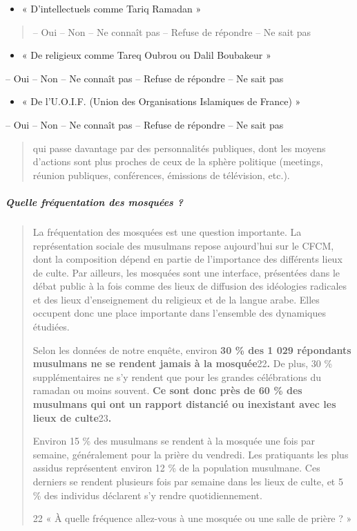 \begin{itemize}
\item
  « D'intellectuels comme Tariq Ramadan »
\end{itemize}

\begin{quote}
-- Oui -- Non -- Ne connaît pas -- Refuse de répondre -- Ne sait pas
\end{quote}

\begin{itemize}
\item
  « De religieux comme Tareq Oubrou ou Dalil Boubakeur »
\end{itemize}

-- Oui -- Non -- Ne connaît pas -- Refuse de répondre -- Ne sait pas

\begin{itemize}
\item
  « De l'U.O.I.F. (Union des Organisations Islamiques de France) »
\end{itemize}

-- Oui -- Non -- Ne connaît pas -- Refuse de répondre -- Ne sait pas

\begin{quote}


qui passe davantage par des personnalités publiques, dont les moyens
d'actions sont plus proches de ceux de la sphère politique (meetings,
réunion publiques, conférences, émissions de télévision, etc.).
\end{quote}

\hypertarget{quelle-fruxe9quentation-des-mosquuxe9es}{%
\subparagraph{Quelle fréquentation des mosquées
?}\label{quelle-fruxe9quentation-des-mosquuxe9es}}

\begin{quote}
La fréquentation des mosquées est une question importante. La
représentation sociale des musulmans repose aujourd'hui sur le CFCM,
dont la composition dépend en partie de l'importance des différents
lieux de culte. Par ailleurs, les mosquées sont une interface,
présentées dans le débat public à la fois comme des lieux de diffusion
des idéologies radicales et des lieux d'enseignement du religieux et de
la langue arabe. Elles occupent donc une place importante dans
l'ensemble des dynamiques étudiées.

Selon les données de notre enquête, environ \textbf{30 \% des 1 029
répondants musulmans ne se rendent jamais à la mosquée}22\textbf{.} De
plus, 30 \% supplémentaires ne s'y rendent que pour les grandes
célébrations du ramadan ou moins souvent. \textbf{Ce sont donc près de
60 \% des musulmans qui ont un rapport distancié ou inexistant avec les
lieux de culte}23\textbf{.}

Environ 15 \% des musulmans se rendent à la mosquée une fois par
semaine, généralement pour la prière du vendredi. Les pratiquants les
plus assidus représentent environ 12 \% de la population musulmane. Ces
derniers se rendent plusieurs fois par semaine dans les lieux de culte,
et 5 \% des individus déclarent s'y rendre quotidiennement.

22 « À quelle fréquence allez-vous à une mosquée ou une salle de prière
? »
\end{quote}

